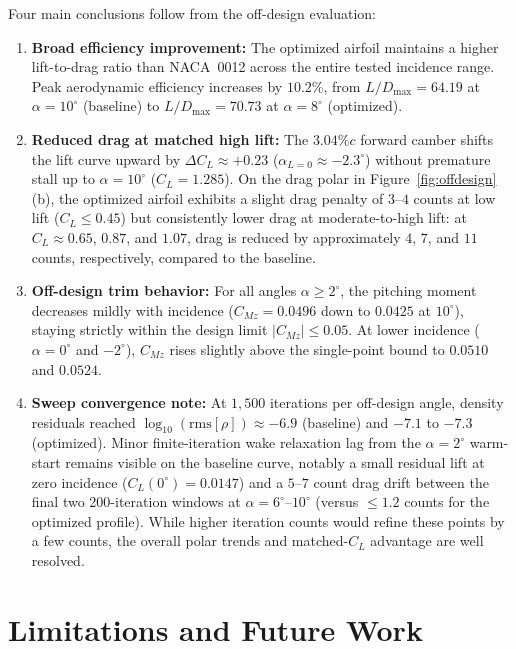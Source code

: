 \documentclass[11pt,a4paper]{article}
\begin{document}
Four main conclusions follow from the off-design evaluation:
\begin{enumerate}
    \item \textbf{Broad efficiency improvement:} The optimized airfoil maintains a higher lift-to-drag ratio than NACA~0012 across the entire tested incidence range. Peak aerodynamic efficiency increases by $10.2\%$, from $L/D_{\max} = 64.19$ at $\alpha = 10^\circ$ (baseline) to $L/D_{\max} = 70.73$ at $\alpha = 8^\circ$ (optimized).
    \item \textbf{Reduced drag at matched high lift:} The $3.04\%c$ forward camber shifts the lift curve upward by $\Delta C_L \approx +0.23$ ($\alpha_{L=0} \approx -2.3^\circ$) without premature stall up to $\alpha = 10^\circ$ ($C_L = 1.285$). On the drag polar in Figure~\ref{fig:offdesign}(b), the optimized airfoil exhibits a slight drag penalty of $3$--$4$ counts at low lift ($C_L \leq 0.45$) but consistently lower drag at moderate-to-high lift: at $C_L \approx 0.65$, $0.87$, and $1.07$, drag is reduced by approximately $4$, $7$, and $11$ counts, respectively, compared to the baseline.
    \item \textbf{Off-design trim behavior:} For all angles $\alpha \geq 2^\circ$, the pitching moment decreases mildly with incidence ($C_{Mz} = 0.0496$ down to $0.0425$ at $10^\circ$), staying strictly within the design limit $|C_{Mz}| \leq 0.05$. At lower incidence ($\alpha = 0^\circ$ and $-2^\circ$), $C_{Mz}$ rises slightly above the single-point bound to $0.0510$ and $0.0524$.
    \item \textbf{Sweep convergence note:} At $1{,}500$ iterations per off-design angle, density residuals reached $\log_{10}(\mathrm{rms}[\rho]) \approx -6.9$ (baseline) and $-7.1$ to $-7.3$ (optimized). Minor finite-iteration wake relaxation lag from the $\alpha = 2^\circ$ warm-start remains visible on the baseline curve, notably a small residual lift at zero incidence ($C_L(0^\circ) = 0.0147$) and a $5$--$7$ count drag drift between the final two 200-iteration windows at $\alpha = 6^\circ$--$10^\circ$ (versus $\leq 1.2$ counts for the optimized profile). While higher iteration counts would refine these points by a few counts, the overall polar trends and matched-$C_L$ advantage are well resolved.
\end{enumerate}

\section{Limitations and Future Work}
\end{document}
